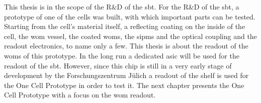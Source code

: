 This thesis is in the scope of the R\&D of the \ac{sbt}.
For the R\&D of the \ac{sbt}, a prototype of one of the cells was built, with which important parts can be tested.
Starting from the cell's material itself, a reflecting coating on the inside of the cell, the \ac{wom} vessel, the coated \acp{wom}, the \acp{sipm} and the optical coupling and the readout electronics, to name only a few.
This thesis is about the readout of the \acp{wom} of this prototype.
In the long run a dedicated \ac{asic} will be used for the readout of the \ac{sbt}.
However, since this chip is still in a very early stage of development by the Forschungszentrum Jülich a readout of the shelf is used for the One Cell Prototype in order to test it.
The next chapter presents the One Cell Prototype with a focus on the \ac{wom} readout.
